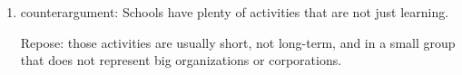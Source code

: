 \documentclass[]{../../../tex/classes/styledArticle}
\begin{document}
\begin{itemize}
\begin{enumerate}
			Hence, being honest may cause unhappiness for a little bit, but in the long run, honesty will result in everyone being happier. 
			
			\item counterargument: Schools have plenty of activities that are not just learning.
			
			Repose: those activities are usually short, not long-term, and in a small group that does not represent big organizations or corporations. 
		\end{enumerate}
	\end{itemize}
	
\end{document}
